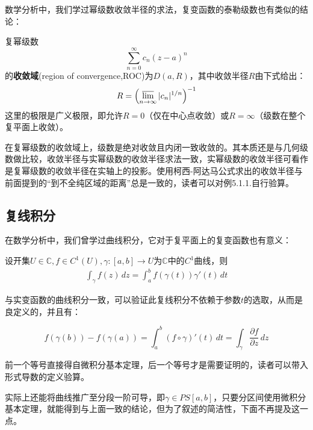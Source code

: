 数学分析中，我们学过幂级数收敛半径的求法，复变函数的泰勒级数也有类似的结论：
\begin{theorem}[柯西-阿达马公式]
    复幂级数\[\sum_{n=0}^{\infty}c_n(z-a)^n\]
    的\textbf{收敛域}(region of convergence,ROC)为$D(a,R)$，其中收敛半径$R$由下式给出：
    \[R=\left(\varlimsup_{n\to\infty}|c_n|^{1/n}\right)^{-1}\]
    这里的极限是广义极限，即允许$R=0$（仅在中心点收敛）或$R=\infty$（级数在整个复平面上收敛）。
\end{theorem}
在复幂级数的收敛域上，级数是绝对收敛且内闭一致收敛的。其本质还是与几何级数做比较，收敛半径与实幂级数的收敛半径求法一致，实幂级数的收敛半径可看作是复幂级数的收敛半径在实轴上的投影。使用柯西-阿达马公式求出的收敛半径与前面提到的“到不全纯区域的距离”总是一致的，读者可以对例5.1.1.自行验算。

\subsection{复线积分}\label{sub:line_integral}
在数学分析中，我们曾学过曲线积分，它对于复平面上的复变函数也有意义：
\begin{definition}[复线积分]
    设开集$U\in\mathbb{C},f\in C^1(U),\gamma:[a,b]\to U$为$\mathbb{C}$中的$C^1$曲线，则
    \begin{align*}
        \int_{\gamma}f(z)\,dz=\int_a^bf(\gamma(t))\gamma'(t)\,dt
    \end{align*}
\end{definition}

与实变函数的曲线积分一致，可以验证此复线积分不依赖于参数$t$的选取，从而是良定义的，并且有：\begin{proposition}
    \[f(\gamma(b))-f(\gamma(a))=\int_{a}^{b}(f\circ \gamma)'(t)\,dt=\int_{\gamma}\frac{\partial f}{\partial z}\,dz\]
\end{proposition}
\begin{remark}
    前一个等号直接得自微积分基本定理，后一个等号才是需要证明的，读者可以带入形式导数的定义验算。
\end{remark}
实际上还能将曲线推广至分段一阶可导，即$\gamma\in PS[a,b]$，只要分区间使用微积分基本定理，就能得到与上面一致的结论，但为了叙述的简洁性，下面不再提及这一点。

